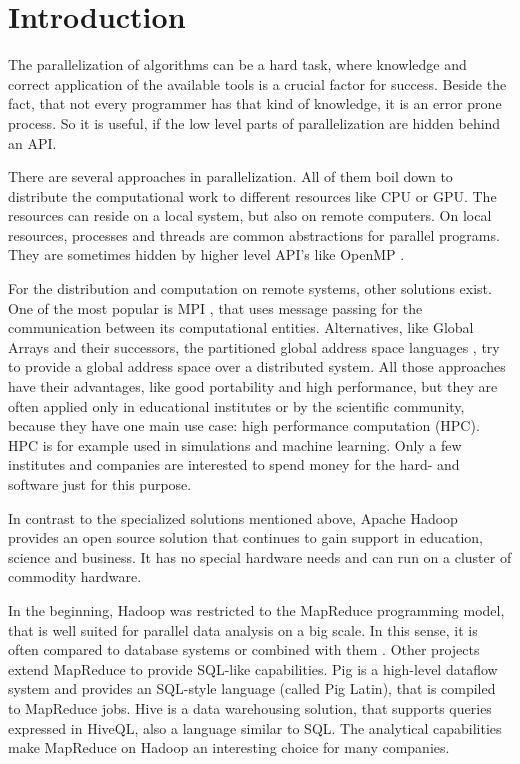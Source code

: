 \chapter{Introduction}
\label{chap:introduction}
The parallelization of algorithms can be a hard task, where knowledge and correct application of the available tools is a crucial factor for success. Beside the fact, that not every programmer has that kind of knowledge, it is an error prone process. So it is useful, if the low level parts of parallelization are hidden behind an API.

There are several approaches in parallelization. All of them boil down to distribute the computational work to different resources like CPU or GPU. The resources can reside on a local system, but also on remote computers. On local resources, processes and threads are common abstractions for parallel programs. They are sometimes hidden by higher level API's like OpenMP \cite{dagum1998openmp}\cite{chapman2008using}.

For the distribution and computation on remote systems, other solutions exist. One of the most popular is MPI \cite{mpi}, that uses message passing for the communication between its computational entities. Alternatives, like Global Arrays \cite{nieplocha1994global} and their successors, the partitioned global address space languages \cite{coarfa2005evaluation}, try to provide a global address space over a distributed system. All those approaches have their advantages, like good portability and high performance, but they are often applied only in educational institutes or by the scientific community, because they have one main use case: high performance computation (HPC). HPC is for example used in simulations and machine learning. Only a few institutes and companies are interested to spend money for the hard- and software just for this purpose.

In contrast to the specialized solutions mentioned above, Apache Hadoop \cite{hadoop} provides an open source solution that continues to gain support in education, science and business. It has no special hardware needs and can run on a cluster of commodity hardware.

In the beginning, Hadoop was restricted to the MapReduce \cite{dean2008mapreduce} programming model, that is well suited for parallel data analysis on a big scale. In this sense, it is often compared to database systems \cite{pavlo2009comparison}\cite{stonebraker2010mapreduce}\cite{floratou2012can} or combined with them  \cite{abouzeid2009hadoopdb}\cite{su2012oracle}. Other projects extend MapReduce to provide SQL-like capabilities. Pig  \cite{gates2009building} is a high-level dataflow system and provides an SQL-style language (called Pig Latin), that is compiled to MapReduce jobs. Hive \cite{thusoo2010hive} is a data warehousing solution, that supports queries expressed in HiveQL, also a language similar to SQL. The analytical capabilities make MapReduce on Hadoop an interesting choice for many companies.

